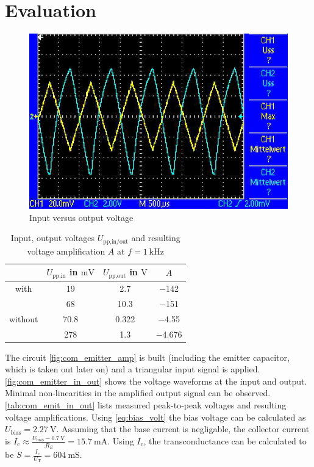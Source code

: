 \section{Evaluation}
\begin{figure}[tbp]
	\centering
	\includegraphics[width=.5\textwidth]{./img/com-emitter-in-out.jpg}
	\caption[Emitter Amplifier Waveforms]{Input versus output voltage}
	\label{fig:com_emitter_in_out}
\end{figure}
\begin{table}[b!]
	\centering
	\caption{Input, output voltages $U_\text{pp,in/out}$ and resulting voltage amplification $A$ at $f=\SI{1}{\kilo\hertz}$}
	\label{tab:com_emit_in_out}
	\begin{tabular}{S|SSS}
		\toprule
		{}&	{$U_\text{pp,in}$ in $\si{\milli\volt}$}&	{$U_\text{pp,out}$ in $\si{\volt}$}&	{$A$}\\
		\midrule
		{with }	&	\num{19}	&	\num{2.7}	&	\num{-142}\\
		{}	&	\num{68}	&	\num{10.3}	&	\num{-151}\\
		\midrule
		{without }	&	\num{70.8}	&	\num{0.322}	&	\num{-4.55}\\
		{}	&	\num{278}	&	\num{1.3}	&	\num{-4.676}\\
		\bottomrule
	\end{tabular}
\end{table}
The circuit \autoref{fig:com_emitter_amp} is built (including the emitter capacitor, which is taken out later on) and a triangular input signal is applied.
\autoref{fig:com_emitter_in_out} shows the voltage waveforms at the input and output.
Minimal non-linearities in the amplified output signal can be observed.
\autoref{tab:com_emit_in_out} lists measured peak-to-peak voltages and resulting voltage amplifications.
Using \autoref{eq:bias_volt} the bias voltage can be calculated as $U_\text{bias}=\SI{2.27}{\volt}$.
Assuming that the base current is negligable, the collector current is $I_\text{c}\approx\frac{U_\text{bias}-\SI{0.7}{\volt}}{\comp{R_E}}=\SI{15.7}{\milli\ampere}$.
Using $I_\text{c}$, the transconductance can be calculated to be $S=\frac{I_\text{c}}{U_\text{T}}=\SI{604}{\milli\siemens}$.
